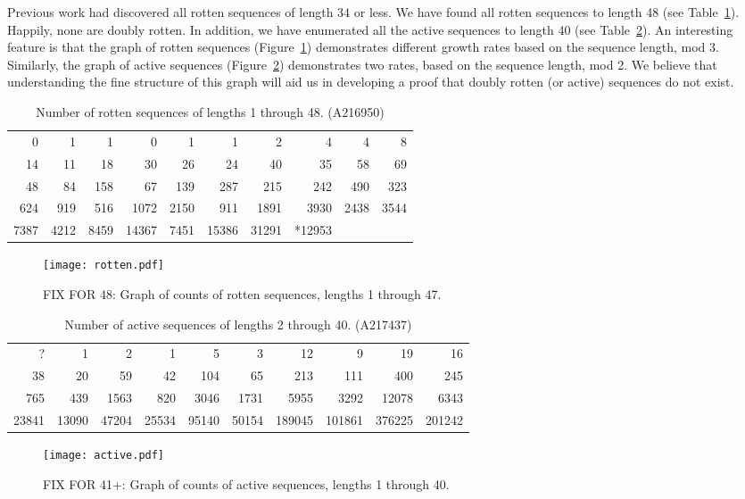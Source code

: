 \documentclass[11pt]{article}
\begin{document}
Previous work had discovered all rotten sequences of length $34$ or less.
We have found all rotten sequences to length 48 (see Table~\ref{tab:rot}).  Happily, none
are doubly rotten.  In addition, we have enumerated all the active sequences
to length 40 (see Table~\ref{tab:act}).  An interesting feature is that
the graph of rotten sequences (Figure~\ref{fig:rot}) demonstrates different
growth rates based on the sequence length, mod 3.  Similarly, the graph
of active sequences (Figure~\ref{fig:act}) demonstrates two rates, based on
the sequence length, mod 2.  We believe that understanding the fine structure
of this graph will aid us in developing a proof that doubly rotten (or active)
sequences do not exist.

\begin{table}\label{tab:rot}
\begin{center}
\begin{tabular}{rrrrrrrrrr}
       0&       1&       1&       0&       1&       1&       2&       4&       4&       8\\
      14&      11&      18&      30&      26&      24&      40&      35&      58&      69\\
      48&      84&     158&      67&     139&     287&     215&     242&     490&     323\\
     624&     919&     516&    1072&    2150&     911&    1891&    3930&    2438&    3544\\
    7387&    4212&    8459&   14367&    7451&   15386&   31291&  *12953&        &
\end{tabular}
\end{center}
\caption[]{Number of rotten sequences of lengths 1 through 48. (A216950)}
\end{table}
\begin{figure}\label{fig:rot}
\begin{center}
\texttt{[image: rotten.pdf]}
\end{center}
\caption[]{FIX FOR 48: Graph of counts of rotten sequences, lengths 1 through 47.}
\end{figure}

\begin{table}\label{tab:act}
\begin{center}
\begin{tabular}{rrrrrrrrrr}
?& 1& 2& 1& 5& 3& 12& 9& 19& 16\\
38& 20& 59& 42& 104& 65& 213& 111& 400& 245\\
765& 439& 1563& 820& 3046& 1731& 5955& 3292& 12078& 6343\\
23841& 13090& 47204& 25534& 95140& 50154& 189045& 101861& 376225& 201242\\
\end{tabular}
\end{center}
\caption[]{Number of active sequences of lengths 2 through 40. (A217437)}
\end{table}
\begin{figure}\label{fig:act}
\begin{center}
\texttt{[image: active.pdf]}
\end{center}
\caption[]{FIX FOR 41+: Graph of counts of active sequences, lengths 1 through 40.}
\end{figure}
\end{document}
